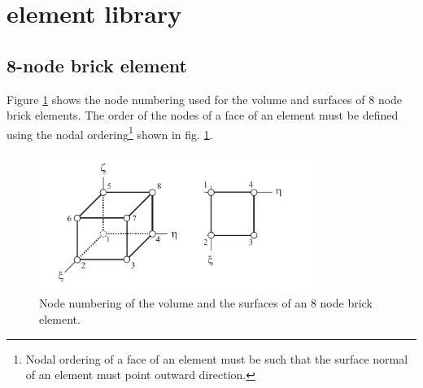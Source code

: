 \documentclass{article}
\begin{document}
 

%
 




\pagebreak

\appendix

\section{element library}

\subsection{8-node brick element}
Figure \ref{fig1} shows the node numbering used for the volume and surfaces of 8 node brick elements. The order of the nodes of a face of an element must be defined using the nodal ordering\footnote{Nodal ordering of a face of an element must be such that the surface normal of an element must point outward direction.} shown in fig. \ref{fig1}.



\begin{figure}[!ht]
    \centering
            \includegraphics[width=0.8\textwidth]{8nodebrick.pdf}
    \caption{Node numbering of the volume and the surfaces of an 8 node brick element.}
    \label{fig1}
\end{figure}
\end{document}
